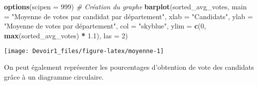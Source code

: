 \documentclass[
]{article}
\newenvironment{Shaded}{\begin{snugshade}}{\end{snugshade}}
\newcommand{\AttributeTok}[1]{\textcolor[rgb]{0.13,0.29,0.53}{#1}}
\newcommand{\CommentTok}[1]{\textcolor[rgb]{0.56,0.35,0.01}{\textit{#1}}}
\newcommand{\DecValTok}[1]{\textcolor[rgb]{0.00,0.00,0.81}{#1}}
\newcommand{\FloatTok}[1]{\textcolor[rgb]{0.00,0.00,0.81}{#1}}
\newcommand{\FunctionTok}[1]{\textcolor[rgb]{0.13,0.29,0.53}{\textbf{#1}}}
\newcommand{\NormalTok}[1]{#1}
\newcommand{\SpecialCharTok}[1]{\textcolor[rgb]{0.81,0.36,0.00}{\textbf{#1}}}
\newcommand{\StringTok}[1]{\textcolor[rgb]{0.31,0.60,0.02}{#1}}
\begin{document}
\begin{Shaded}
\begin{Highlighting}[]
\FunctionTok{options}\NormalTok{(}\AttributeTok{scipen =} \DecValTok{999}\NormalTok{)}
\CommentTok{\# Création du graphe}
\FunctionTok{barplot}\NormalTok{(sorted\_avg\_votes, }
        \AttributeTok{main =} \StringTok{"Moyenne de votes par candidat par département"}\NormalTok{,}
        \AttributeTok{xlab =} \StringTok{"Candidats"}\NormalTok{,}
        \AttributeTok{ylab =} \StringTok{"Moyenne de votes par département"}\NormalTok{,}
        \AttributeTok{col =} \StringTok{"skyblue"}\NormalTok{,}
        \AttributeTok{ylim =} \FunctionTok{c}\NormalTok{(}\DecValTok{0}\NormalTok{, }\FunctionTok{max}\NormalTok{(sorted\_avg\_votes) }\SpecialCharTok{*} \FloatTok{1.1}\NormalTok{),}
        \AttributeTok{las =} \DecValTok{2}\NormalTok{)}
\end{Highlighting}
\end{Shaded}

\begin{center}\texttt{[image: Devoir1\_files/figure-latex/moyenne-1]} \end{center}

On peut également représenter les pourcentages d'obtention de vote des
candidats grâce à un diagramme circulaire.
\end{document}
